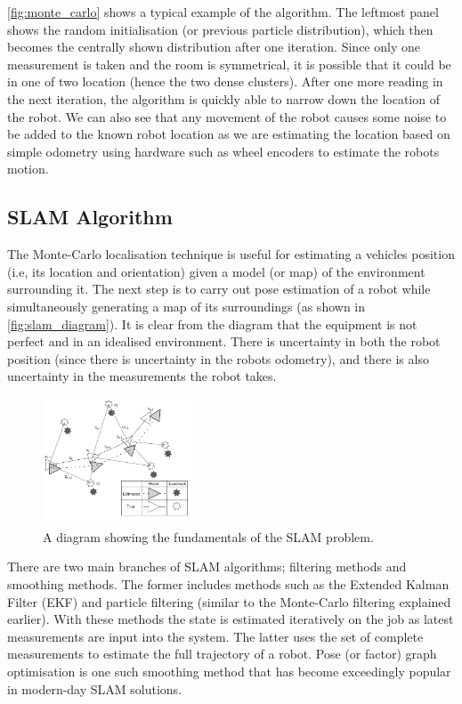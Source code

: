 \autoref{fig:monte_carlo} shows a typical example of the algorithm. The leftmost panel shows the random initialisation (or previous particle distribution), which then becomes the centrally shown distribution after one iteration. Since only one measurement is taken and the room is symmetrical, it is possible that it could be in one of two location (hence the two dense clusters). After one more reading in the next iteration, the algorithm is quickly able to narrow down the location of the robot. We can also see that any movement of the robot causes some noise to be added to the known robot location as we are estimating the location based on simple odometry using hardware such as wheel encoders to estimate the robots motion.

\subsection{SLAM Algorithm}

The Monte-Carlo localisation technique is useful for estimating a vehicles position (i.e, its location and orientation) given a model (or map) of the environment surrounding it. The next step is to carry out pose estimation of a robot while simultaneously generating a map of its surroundings (as shown in \autoref{fig:slam_diagram}). It is clear from the diagram that the equipment is not perfect and in an idealised environment. There is uncertainty in both the robot position (since there is uncertainty in the robots odometry), and there is also uncertainty in the measurements the robot takes.

\begin{figure}[htb]
      \centering
      \includegraphics[width=0.4\textwidth]{background/images/slam_diagram.png}
      \caption{A diagram showing the fundamentals of the SLAM problem\cite{BasicSlam}.}
      \label{fig:slam_diagram}
\end{figure}

There are two main branches of SLAM algorithms; filtering methods and smoothing methods. The former includes methods such as the Extended Kalman Filter (EKF) and particle filtering (similar to the Monte-Carlo filtering explained earlier). With these methods the state is estimated iteratively on the job as latest measurements are input into the system. The latter uses the set of complete measurements to estimate the full trajectory of a robot. Pose (or factor) graph optimisation is one such smoothing method that has become exceedingly popular in modern-day SLAM solutions.

